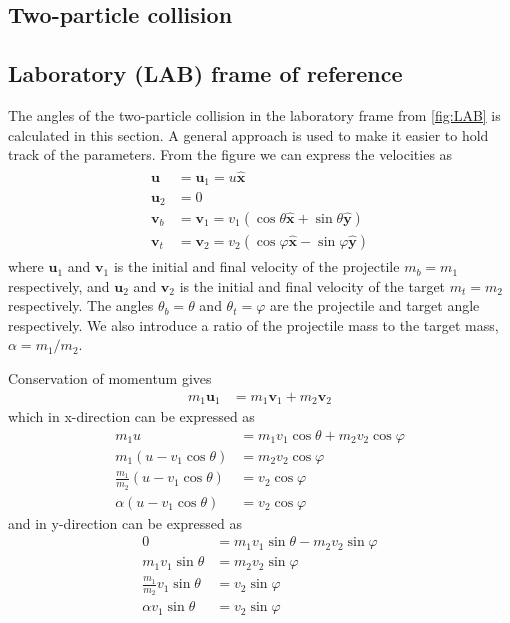 \documentclass[twoside,english]{uiofysmaster/uiofysmaster}
\begin{document}
\begin{appendices}
\chapter{Two-particle collision}
\section{Laboratory (LAB) frame of reference}\label{sec:LAB}
The angles of the two-particle collision in the laboratory frame from \autoref{fig:LAB} is calculated in this section. A general approach is used to make it easier to hold track of the parameters. From the figure we can express the velocities as
\begin{align}\label{eq:2p-LAB-collision}
\begin{split}
	 \boldsymbol{u} &= \boldsymbol{u}_1 = u \boldsymbol{\hat{x}}  \\
	 \boldsymbol{u}_2 &= 0  \\
	 \boldsymbol{v}_b &= \boldsymbol{v}_1 = v_1 (\cos \theta \boldsymbol{\hat{x}} + \sin \theta \boldsymbol{\hat{y}})  \\
	\boldsymbol{v}_t &= \boldsymbol{v}_2 = v_2 (\cos \varphi \boldsymbol{\hat{x}} - \sin \varphi \boldsymbol{\hat{y}})
\end{split}
\end{align}
where $\boldsymbol{u}_1$ and $\boldsymbol{v}_1$ is the initial and final velocity of the projectile $m_b = m_1$ respectively, and $\boldsymbol{u}_2$ and $\boldsymbol{v}_2$ is the initial and final velocity of the target $m_t = m_2$ respectively. The angles $\theta_b = \theta$ and $\theta_t = \varphi$ are the projectile and target angle respectively. We also introduce a ratio of the projectile mass to the target mass, $\alpha = m_1/m_2$.

Conservation of momentum gives
\begin{align*}%
	m_1 \boldsymbol{u}_1 &= m_1 \boldsymbol{v}_1 + m_2 \boldsymbol{v}_2
\end{align*}
which in x-direction can be expressed as
\begin{align}\label{eq:comx}
	m_1 u &= m_1 v_1 \cos \theta + m_2 v_2 \cos \varphi  \nonumber\\
	m_1 (u - v_1 \cos \theta) &= m_2 v_2 \cos \varphi  \nonumber\\
	\frac{m_1}{m_2} (u - v_1 \cos \theta) &= v_2 \cos \varphi  \nonumber\\
	\alpha (u - v_1 \cos \theta) &= v_2 \cos \varphi
\end{align}
and in y-direction can be expressed as
\begin{align}\label{eq:comy}
	0 &= m_1 v_1 \sin \theta - m_2 v_2 \sin \varphi \nonumber\\
	m_1 v_1 \sin \theta &= m_2 v_2 \sin \varphi \nonumber\\
	\frac{m_1}{m_2} v_1 \sin \theta &= v_2 \sin \varphi \nonumber\\
	\alpha v_1 \sin \theta &= v_2 \sin \varphi
\end{align}


\end{appendices}
\end{document}
